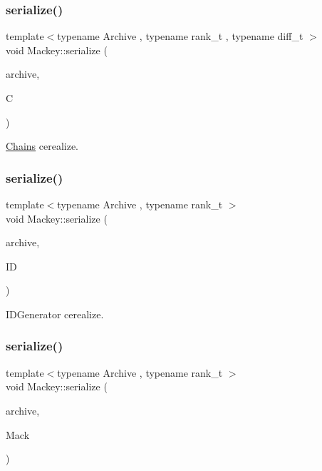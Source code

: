 \subsubsection{\texorpdfstring{serialize()}{serialize()}\hspace{0.1cm}{\footnotesize\ttfamily [1/6]}}
{\footnotesize\ttfamily template$<$typename Archive , typename rank\+\_\+t , typename diff\+\_\+t $>$ \\
void Mackey\+::serialize (\begin{DoxyParamCaption}\item[{Archive \&}]{archive,  }\item[{\hyperlink{classMackey_1_1Chains}{Chains}$<$ rank\+\_\+t, diff\+\_\+t $>$ \&}]{C }\end{DoxyParamCaption})}



\hyperlink{classMackey_1_1Chains}{Chains} cerealize. 

\mbox{\label{namespaceMackey_ac78e550c9949977ed71367fb21892e93}} 
\subsubsection{\texorpdfstring{serialize()}{serialize()}\hspace{0.1cm}{\footnotesize\ttfamily [2/6]}}
{\footnotesize\ttfamily template$<$typename Archive , typename rank\+\_\+t $>$ \\
void Mackey\+::serialize (\begin{DoxyParamCaption}\item[{Archive \&}]{archive,  }\item[{\hyperlink{classMackey_1_1IDGenerators}{I\+D\+Generators}$<$ rank\+\_\+t $>$ \&}]{ID }\end{DoxyParamCaption})}



I\+D\+Generator cerealize. 

\mbox{\label{namespaceMackey_aa1f463e9991b727f5c74e430eccee044}} 
\subsubsection{\texorpdfstring{serialize()}{serialize()}\hspace{0.1cm}{\footnotesize\ttfamily [3/6]}}
{\footnotesize\ttfamily template$<$typename Archive , typename rank\+\_\+t $>$ \\
void Mackey\+::serialize (\begin{DoxyParamCaption}\item[{Archive \&}]{archive,  }\item[{\hyperlink{classMackey_1_1MackeyFunctor}{Mackey\+Functor}$<$ rank\+\_\+t $>$ \&}]{Mack }\end{DoxyParamCaption})}



